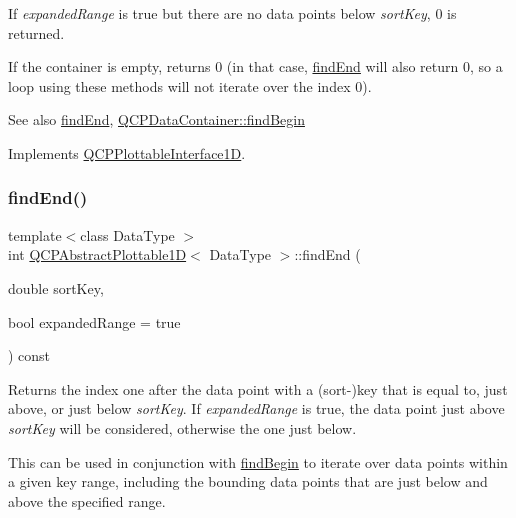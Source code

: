 If {\itshape expanded\+Range} is true but there are no data points below {\itshape sort\+Key}, 0 is returned.

If the container is empty, returns 0 (in that case, \mbox{\hyperlink{class_q_c_p_abstract_plottable1_d_ad913df7f02add35150779dce3913aeae}{find\+End}} will also return 0, so a loop using these methods will not iterate over the index 0).

\begin{DoxySeeAlso}{See also}
\mbox{\hyperlink{class_q_c_p_abstract_plottable1_d_ad913df7f02add35150779dce3913aeae}{find\+End}}, \mbox{\hyperlink{class_q_c_p_data_container_a2ad8a5399072d99a242d3a6d2d7e278a}{Q\+C\+P\+Data\+Container\+::find\+Begin}} 
\end{DoxySeeAlso}


Implements \mbox{\hyperlink{class_q_c_p_plottable_interface1_d_a5b95783271306a4de97be54eac1e7d13}{Q\+C\+P\+Plottable\+Interface1D}}.

\mbox{\label{class_q_c_p_abstract_plottable1_d_ad913df7f02add35150779dce3913aeae}} 
\subsubsection{\texorpdfstring{find\+End()}{findEnd()}}
{\footnotesize\ttfamily template$<$class Data\+Type $>$ \\
int \mbox{\hyperlink{class_q_c_p_abstract_plottable1_d}{Q\+C\+P\+Abstract\+Plottable1D}}$<$ Data\+Type $>$\+::find\+End (\begin{DoxyParamCaption}\item[{double}]{sort\+Key,  }\item[{bool}]{expanded\+Range = {\ttfamily true} }\end{DoxyParamCaption}) const\hspace{0.3cm}{\ttfamily [virtual]}}





Returns the index one after the data point with a (sort-\/)key that is equal to, just above, or just below {\itshape sort\+Key}. If {\itshape expanded\+Range} is true, the data point just above {\itshape sort\+Key} will be considered, otherwise the one just below.

This can be used in conjunction with \mbox{\hyperlink{class_q_c_p_abstract_plottable1_d_ae6ead74a0d6a17954e1857f361b9ccf2}{find\+Begin}} to iterate over data points within a given key range, including the bounding data points that are just below and above the specified range.

